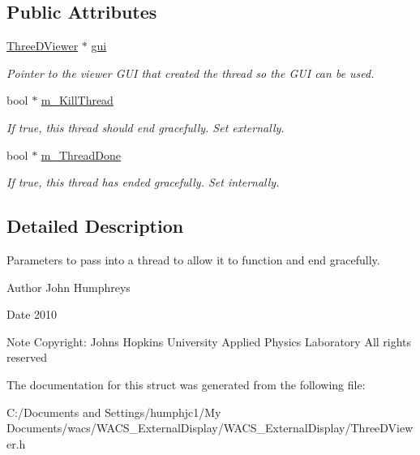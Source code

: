 \subsection*{Public Attributes}
\begin{DoxyCompactItemize}
\item 
\hypertarget{struct_thread_params_a6bf914b937f40910f731850338146e2c}{
\hyperlink{class_three_d_viewer}{ThreeDViewer} $\ast$ \hyperlink{struct_thread_params_a6bf914b937f40910f731850338146e2c}{gui}}
\label{struct_thread_params_a6bf914b937f40910f731850338146e2c}

\begin{DoxyCompactList}\small\item\em Pointer to the viewer GUI that created the thread so the GUI can be used. \end{DoxyCompactList}\item 
\hypertarget{struct_thread_params_aab8a6a90061dd56a680e3c5e885963e7}{
bool $\ast$ \hyperlink{struct_thread_params_aab8a6a90061dd56a680e3c5e885963e7}{m\_\-KillThread}}
\label{struct_thread_params_aab8a6a90061dd56a680e3c5e885963e7}

\begin{DoxyCompactList}\small\item\em If true, this thread should end gracefully. Set externally. \end{DoxyCompactList}\item 
\hypertarget{struct_thread_params_ae3b90ece4043465bc3e1e46c4a0d0ef8}{
bool $\ast$ \hyperlink{struct_thread_params_ae3b90ece4043465bc3e1e46c4a0d0ef8}{m\_\-ThreadDone}}
\label{struct_thread_params_ae3b90ece4043465bc3e1e46c4a0d0ef8}

\begin{DoxyCompactList}\small\item\em If true, this thread has ended gracefully. Set internally. \end{DoxyCompactList}\end{DoxyCompactItemize}


\subsection{Detailed Description}
Parameters to pass into a thread to allow it to function and end gracefully. 

\begin{DoxyAuthor}{Author}
John Humphreys 
\end{DoxyAuthor}
\begin{DoxyDate}{Date}
2010 
\end{DoxyDate}
\begin{DoxyNote}{Note}
Copyright: Johns Hopkins University Applied Physics Laboratory All rights reserved 
\end{DoxyNote}


The documentation for this struct was generated from the following file:\begin{DoxyCompactItemize}
\item 
C:/Documents and Settings/humphjc1/My Documents/wacs/WACS\_\-ExternalDisplay/WACS\_\-ExternalDisplay/ThreeDViewer.h\end{DoxyCompactItemize}

